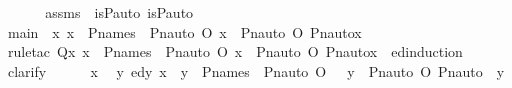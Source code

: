 \begin{isabellebody}
%
\isadelimproof
%
\endisadelimproof
%
\isatagproof
{}\isamarkupfalse%
\ {\isacharminus}{\kern0pt}\ \isanewline
\ \ \isamarkupfalse%
\ assms\ {\isacharcolon}{\kern0pt}\ {\isachardoublequoteopen}is{\isacharunderscore}{\kern0pt}P{\isacharunderscore}{\kern0pt}auto{\isacharparenleft}{\kern0pt}{\isasympi}{\isacharparenright}{\kern0pt}{\isachardoublequoteclose}\ {\isachardoublequoteopen}is{\isacharunderscore}{\kern0pt}P{\isacharunderscore}{\kern0pt}auto{\isacharparenleft}{\kern0pt}{\isasymtau}{\isacharparenright}{\kern0pt}{\isachardoublequoteclose}\isanewline
\ \ \isamarkupfalse%
\ main\ {\isacharcolon}{\kern0pt}\ {\isachardoublequoteopen}{\isasymAnd}x{\isachardot}{\kern0pt}\ x\ {\isasymin}\ P{\isacharunderscore}{\kern0pt}names\ {\isasymlongrightarrow}\ Pn{\isacharunderscore}{\kern0pt}auto{\isacharparenleft}{\kern0pt}{\isasympi}\ O\ {\isasymtau}{\isacharparenright}{\kern0pt}{\isacharbackquote}{\kern0pt}x\ {\isacharequal}{\kern0pt}\ {\isacharparenleft}{\kern0pt}Pn{\isacharunderscore}{\kern0pt}auto{\isacharparenleft}{\kern0pt}{\isasympi}{\isacharparenright}{\kern0pt}\ O\ Pn{\isacharunderscore}{\kern0pt}auto{\isacharparenleft}{\kern0pt}{\isasymtau}{\isacharparenright}{\kern0pt}{\isacharparenright}{\kern0pt}{\isacharbackquote}{\kern0pt}x{\isachardoublequoteclose}\isanewline
\ \ \ \ \isamarkupfalse%
\ {\isacharparenleft}{\kern0pt}rule{\isacharunderscore}{\kern0pt}tac\ Q{\isacharequal}{\kern0pt}{\isachardoublequoteopen}{\isasymlambda}x{\isachardot}{\kern0pt}\ x\ {\isasymin}\ P{\isacharunderscore}{\kern0pt}names\ {\isasymlongrightarrow}\ Pn{\isacharunderscore}{\kern0pt}auto{\isacharparenleft}{\kern0pt}{\isasympi}\ O\ {\isasymtau}{\isacharparenright}{\kern0pt}{\isacharbackquote}{\kern0pt}x\ {\isacharequal}{\kern0pt}\ {\isacharparenleft}{\kern0pt}Pn{\isacharunderscore}{\kern0pt}auto{\isacharparenleft}{\kern0pt}{\isasympi}{\isacharparenright}{\kern0pt}\ O\ Pn{\isacharunderscore}{\kern0pt}auto{\isacharparenleft}{\kern0pt}{\isasymtau}{\isacharparenright}{\kern0pt}{\isacharparenright}{\kern0pt}{\isacharbackquote}{\kern0pt}x{\isachardoublequoteclose}\ \ ed{\isacharunderscore}{\kern0pt}induction{\isacharparenright}{\kern0pt}\isanewline
\ \ \isamarkupfalse%
\ {\isacharparenleft}{\kern0pt}clarify{\isacharparenright}{\kern0pt}\isanewline
\ \ \ \ \isamarkupfalse%
\ x\ \isamarkupfalse%
\ {\isachardoublequoteopen}{\isasymAnd}y{\isachardot}{\kern0pt}\ ed{\isacharparenleft}{\kern0pt}y{\isacharcomma}{\kern0pt}\ x{\isacharparenright}{\kern0pt}\ {\isasymLongrightarrow}\ y\ {\isasymin}\ P{\isacharunderscore}{\kern0pt}names\ {\isasymlongrightarrow}\ Pn{\isacharunderscore}{\kern0pt}auto{\isacharparenleft}{\kern0pt}{\isasympi}\ O\ {\isasymtau}{\isacharparenright}{\kern0pt}\ {\isacharbackquote}{\kern0pt}\ y\ {\isacharequal}{\kern0pt}\ {\isacharparenleft}{\kern0pt}Pn{\isacharunderscore}{\kern0pt}auto{\isacharparenleft}{\kern0pt}{\isasympi}{\isacharparenright}{\kern0pt}\ O\ Pn{\isacharunderscore}{\kern0pt}auto{\isacharparenleft}{\kern0pt}{\isasymtau}{\isacharparenright}{\kern0pt}{\isacharparenright}{\kern0pt}\ {\isacharbackquote}{\kern0pt}\ y{\isachardoublequoteclose}\isanewline

\end{isabellebody}
